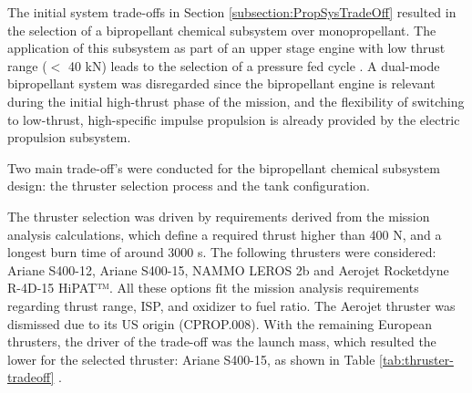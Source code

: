 \documentclass[conference]{IEEEtran}
\begin{document}
The initial system trade-offs in Section \ref{subsection:PropSysTradeOff} resulted in the selection of a bipropellant chemical subsystem over monopropellant. The application of this subsystem as part of an upper stage engine with low thrust range ($<$ 40 kN) leads to the selection of a pressure fed cycle \cite{Manfletti.2022}.
A dual-mode bipropellant system was disregarded since the bipropellant engine is relevant during the initial high-thrust phase of the mission, and the flexibility of switching to low-thrust, high-specific impulse propulsion is already provided by the electric propulsion subsystem.

Two main trade-off's were conducted for the bipropellant chemical subsystem design: the thruster selection process and the tank configuration. 

The thruster selection was driven by requirements derived from the mission analysis calculations, which define a required thrust higher than 400 N, and a longest burn time of around 3000 s. The following thrusters were considered: Ariane S400-12, Ariane S400-15, NAMMO LEROS 2b and Aerojet Rocketdyne R-4D-15 HiPAT™. All these options fit the mission analysis requirements regarding thrust range, ISP, and oxidizer to fuel ratio. The Aerojet thruster was dismissed due to its US origin (CPROP.008). With the remaining European thrusters, the driver of the trade-off was the launch mass, which resulted the lower for the selected thruster: Ariane S400-15, as shown in Table \ref{tab:thruster-tradeoff} \cite{Ariane.2023}. 
\end{document}
